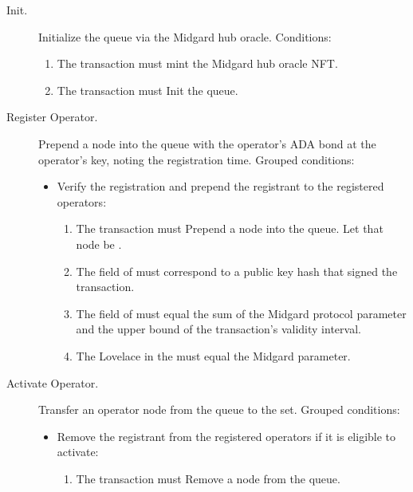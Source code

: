 \documentclass[../midgard.tex]{subfiles}
\begin{document}
\begin{description}
    \item[Init.] Initialize the  queue via the Midgard hub oracle.
      Conditions:
        \begin{enumerate}
            \item The transaction must mint the Midgard hub oracle NFT.
            \item The transaction must Init the  queue.
        \end{enumerate}
    \item[Register Operator.] Prepend a node into the  queue with the operator's ADA bond at the operator's key, noting the registration time.
      Grouped conditions:
        \begin{itemize}
            \item Verify the registration and prepend the registrant to the registered operators:
            \begin{enumerate}
                \item The transaction must Prepend a node into the  queue.
                  Let that node be .
                \item The  field of  must correspond to a public key hash that signed the transaction.
                \item The  field of  must equal the sum of the Midgard  protocol parameter and the upper bound of the transaction's validity interval.
                \item The Lovelace in the  must equal the  Midgard parameter.
            \end{enumerate}
        \end{itemize}
    \item[Activate Operator.] Transfer an operator node from the  queue to the  set.
      Grouped conditions:
        \begin{itemize}
            \item Remove the registrant from the registered operators if it is eligible to activate:
            \begin{enumerate}
                \item The transaction must Remove a node from the  queue.

\end{enumerate}
\end{itemize}
\end{description}
\end{document}

